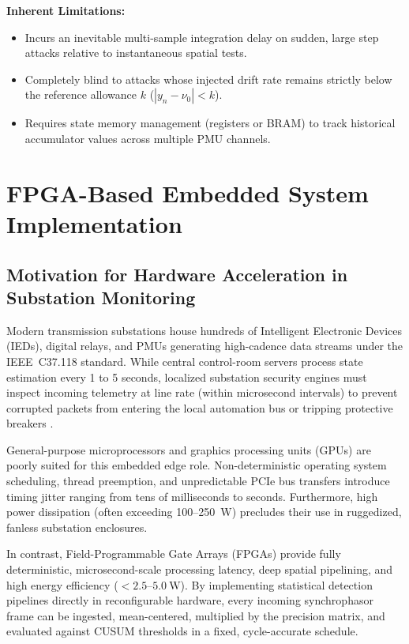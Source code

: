 \documentclass[12pt,a4paper]{report}
\begin{document}
\textbf{Inherent Limitations:}
\begin{itemize}
    \item Incurs an inevitable multi-sample integration delay on sudden, large step attacks
    relative to instantaneous spatial tests.
    \item Completely blind to attacks whose injected drift rate remains strictly below the
    reference allowance $k$ ($|y_n - \nu_0| < k$).
    \item Requires state memory management (registers or BRAM) to track historical accumulator
    values across multiple PMU channels.
\end{itemize}

\section{FPGA-Based Embedded System Implementation}

\subsection{Motivation for Hardware Acceleration in Substation Monitoring}
Modern transmission substations house hundreds of Intelligent Electronic Devices (IEDs),
digital relays, and PMUs generating high-cadence data streams under the IEEE~C37.118 standard.
While central control-room servers process state estimation every 1 to 5 seconds, localized
substation security engines must inspect incoming telemetry at line rate (within microsecond
intervals) to prevent corrupted packets from entering the local automation bus or tripping
protective breakers \cite{zhang2024}.

General-purpose microprocessors and graphics processing units (GPUs) are poorly suited for
this embedded edge role. Non-deterministic operating system scheduling, thread preemption,
and unpredictable PCIe bus transfers introduce timing jitter ranging from tens of milliseconds
to seconds. Furthermore, high power dissipation (often exceeding 100--250~W) precludes their
use in ruggedized, fanless substation enclosures.

In contrast, Field-Programmable Gate Arrays (FPGAs) provide fully deterministic, microsecond-scale
processing latency, deep spatial pipelining, and high energy efficiency ($< 2.5\text{--}5.0~\text{W}$).
By implementing statistical detection pipelines directly in reconfigurable hardware, every
incoming synchrophasor frame can be ingested, mean-centered, multiplied by the precision matrix,
and evaluated against CUSUM thresholds in a fixed, cycle-accurate schedule.
\end{document}
